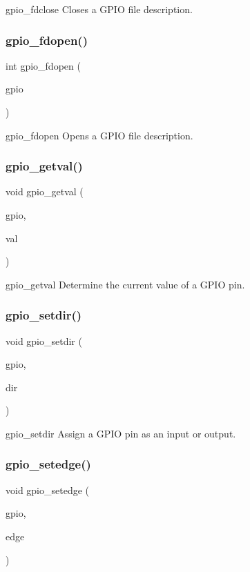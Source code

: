gpio\+\_\+fdclose Closes a G\+P\+IO file description. \mbox{\label{gpio_8h_af7aa14aee780d55285274db5c2ed8348}} 
\subsubsection{gpio\+\_\+fdopen()}
{\footnotesize\ttfamily int gpio\+\_\+fdopen (\begin{DoxyParamCaption}\item[{uint}]{gpio }\end{DoxyParamCaption})}

gpio\+\_\+fdopen Opens a G\+P\+IO file description. \mbox{\label{gpio_8h_a75d4417a403bb01d9c3d6eec4102e3b0}} 
\subsubsection{gpio\+\_\+getval()}
{\footnotesize\ttfamily void gpio\+\_\+getval (\begin{DoxyParamCaption}\item[{uint}]{gpio,  }\item[{uint $\ast$}]{val }\end{DoxyParamCaption})}

gpio\+\_\+getval Determine the current value of a G\+P\+IO pin. \mbox{\label{gpio_8h_a311e196f50d423d9f18cf5c1736a821a}} 
\subsubsection{gpio\+\_\+setdir()}
{\footnotesize\ttfamily void gpio\+\_\+setdir (\begin{DoxyParamCaption}\item[{uint}]{gpio,  }\item[{enum \textbf{ P\+I\+N\+\_\+\+D\+IR}}]{dir }\end{DoxyParamCaption})}

gpio\+\_\+setdir Assign a G\+P\+IO pin as an input or output. \mbox{\label{gpio_8h_ac458f19324ea884432b863ad8a8a6413}} 
\subsubsection{gpio\+\_\+setedge()}
{\footnotesize\ttfamily void gpio\+\_\+setedge (\begin{DoxyParamCaption}\item[{uint}]{gpio,  }\item[{char $\ast$}]{edge }\end{DoxyParamCaption})}

